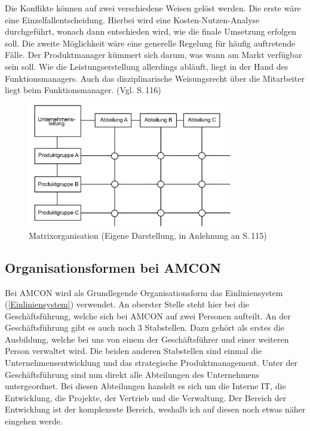         Die Konflikte können auf zwei verschiedene Weisen gelöst werden. Die erste wäre eine Einzelfallentscheidung. 
        Hierbei wird eine Kosten-Nutzen-Analyse durchgeführt, wonach dann entschieden wird, wie die finale Umsetzung 
        erfolgen soll. Die zweite Möglichkeit wäre eine generelle Regelung für häufig auftretende Fälle. Der
        Produktmanager kümmert sich darum, was wann am Markt verfügbar sein soll. Wie die Leistungserstellung allerdings
        abläuft, liegt in der Hand des Funktionsmanagers. Auch das disziplinarische Weisungsrecht über die Mitarbeiter
        liegt beim Funktionsmanager. (Vgl. \cite{Woehe2020} S.\,116)

        \begin{figure}[ht]
            \centering
            \includegraphics[width = 0.8\textwidth]{Eigene Darstellungen/Matrixstruktur.PNG}
            \caption{Matrixorganisation (Eigene Darstellung, in Anlehnung an \cite{Woehe2020} S.\,115)} \label{Matrix}
        \end{figure}

    \subsection{Organisationsformen bei AMCON} \label{Oformen AMCON}
        Bei AMCON wird als Grundlegende Organisationsform das Einliniensystem (\ref{Einliniensystem}) verwendet. An 
        oberster Stelle steht hier bei die Geschäftsführung, welche sich bei AMCON auf zwei Personen aufteilt. An der
        Geschäftsführung gibt es auch noch 3 Stabstellen. Dazu gehört als erstes die Ausbildung, welche bei uns von 
        einem der Geschäftsführer und einer weiteren Person verwaltet wird. Die beiden anderen Stabstellen sind einmal
        die Unternehmensentwicklung und das strategische Produktmanagement. Unter der Geschäftsführung sind nun direkt 
        alle Abteilungen des Unternehmens untergeordnet. Bei diesen Abteilungen handelt es sich um die Interne IT, die 
        Entwicklung, die Projekte, der Vertrieb und die Verwaltung. Der Bereich der Entwicklung ist der komplexeste 
        Bereich, weshalb ich auf diesen noch etwas näher eingehen werde.

